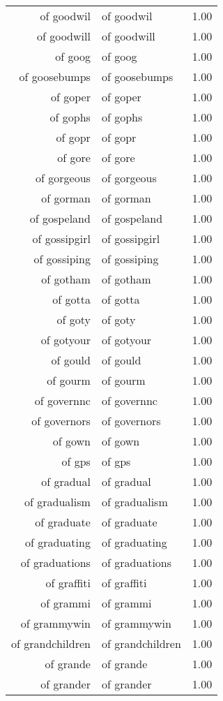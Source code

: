 \begin{table}[ht]
\begin{tabular}{rlr}
  of goodwil & of goodwil & 1.00 \\ 
  of goodwill & of goodwill & 1.00 \\ 
  of goog & of goog & 1.00 \\ 
  of goosebumps & of goosebumps & 1.00 \\ 
  of goper & of goper & 1.00 \\ 
  of gophs & of gophs & 1.00 \\ 
  of gopr & of gopr & 1.00 \\ 
  of gore & of gore & 1.00 \\ 
  of gorgeous & of gorgeous & 1.00 \\ 
  of gorman & of gorman & 1.00 \\ 
  of gospeland & of gospeland & 1.00 \\ 
  of gossipgirl & of gossipgirl & 1.00 \\ 
  of gossiping & of gossiping & 1.00 \\ 
  of gotham & of gotham & 1.00 \\ 
  of gotta & of gotta & 1.00 \\ 
  of goty & of goty & 1.00 \\ 
  of gotyour & of gotyour & 1.00 \\ 
  of gould & of gould & 1.00 \\ 
  of gourm & of gourm & 1.00 \\ 
  of governnc & of governnc & 1.00 \\ 
  of governors & of governors & 1.00 \\ 
  of gown & of gown & 1.00 \\ 
  of gps & of gps & 1.00 \\ 
  of gradual & of gradual & 1.00 \\ 
  of gradualism & of gradualism & 1.00 \\ 
  of graduate & of graduate & 1.00 \\ 
  of graduating & of graduating & 1.00 \\ 
  of graduations & of graduations & 1.00 \\ 
  of graffiti & of graffiti & 1.00 \\ 
  of grammi & of grammi & 1.00 \\ 
  of grammywin & of grammywin & 1.00 \\ 
  of grandchildren & of grandchildren & 1.00 \\ 
  of grande & of grande & 1.00 \\ 
  of grander & of grander & 1.00 \\ 

\end{tabular}
\end{table}
